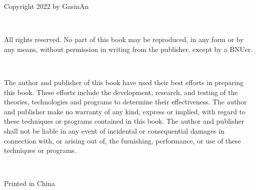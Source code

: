 \thispagestyle{empty}

\noindent Copyright \textcopyright{} 2022 by GasinAn

\ 

\noindent All rights reserved. No part of this book may be reproduced, in any form or by any means, without permission in writing from the publisher, except by a BNUer.

\ 

\noindent The author and publisher of this book have used their best efforts in preparing this book. These efforts include the development, research, and testing of the theories, technologies and programs to determine their effectiveness. The author and publisher make no warranty of any kind, express or implied, with regard to these techniques or programs contained in this book. The author and publisher shall not be liable in any event of incidental or consequential damages in connection with, or arising out of, the furnishing, performance, or use of these techniques or programs.

\ 

\noindent Printed in China
